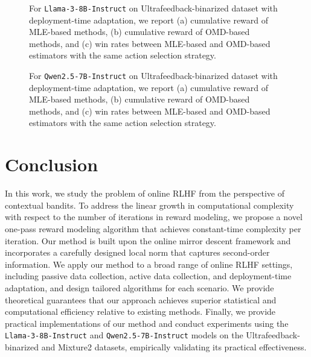 \begin{figure}[!t]
    \centering
    \hfill
    \hfill
    \caption{For \texttt{Llama-3-8B-Instruct} on Ultrafeedback-binarized dataset with deployment-time adaptation, we report (a) cumulative reward of MLE-based methods, (b) cumulative reward of OMD-based methods, and (c) win rates between MLE-based and OMD-based estimators with the same action selection strategy.}
    \label{fig:deployment}
\end{figure}

\begin{figure}[!t]
    \centering
    \hfill
    \hfill
    \caption{For \texttt{Qwen2.5-7B-Instruct} on Ultrafeedback-binarized dataset with deployment-time adaptation, we report (a) cumulative reward of MLE-based methods, (b) cumulative reward of OMD-based methods, and (c) win rates between MLE-based and OMD-based estimators with the same action selection strategy.}
    \label{fig:deployment_qwen}
\end{figure}


\section{Conclusion}
\label{sec:conclusion}

In this work, we study the problem of online RLHF from the perspective of contextual bandits. To address the linear growth in computational complexity with respect to the number of iterations in reward modeling, we propose a novel one-pass reward modeling algorithm that achieves constant-time complexity per iteration. Our method is built upon the online mirror descent framework and incorporates a carefully designed local norm that captures second-order information. We apply our method to a broad range of online RLHF settings, including passive data collection, active data collection, and deployment-time adaptation, and design tailored algorithms for each scenario. We provide theoretical guarantees that our approach achieves superior statistical and computational efficiency relative to existing methods. Finally, we provide practical implementations of our method and conduct experiments using the \texttt{Llama-3-8B-Instruct} and \texttt{Qwen2.5-7B-Instruct} models on the Ultrafeedback-binarized and Mixture2 datasets, empirically validating its practical effectiveness.

